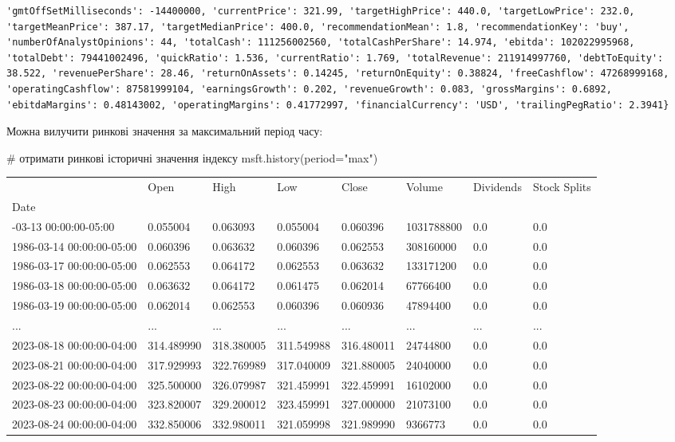\documentclass[
  letterpaper,
]{report}
\newenvironment{Shaded}{\begin{snugshade}}{\end{snugshade}}
\newcommand{\CommentTok}[1]{\textcolor[rgb]{0.37,0.37,0.37}{#1}}
\newcommand{\NormalTok}[1]{\textcolor[rgb]{0.00,0.23,0.31}{#1}}
\newcommand{\OperatorTok}[1]{\textcolor[rgb]{0.37,0.37,0.37}{#1}}
\newcommand{\StringTok}[1]{\textcolor[rgb]{0.13,0.47,0.30}{#1}}
\begin{document}
\begin{verbatim}
'gmtOffSetMilliseconds': -14400000, 'currentPrice': 321.99, 'targetHighPrice': 440.0, 'targetLowPrice': 232.0, 'targetMeanPrice': 387.17, 'targetMedianPrice': 400.0, 'recommendationMean': 1.8, 'recommendationKey': 'buy', 'numberOfAnalystOpinions': 44, 'totalCash': 111256002560, 'totalCashPerShare': 14.974, 'ebitda': 102022995968, 'totalDebt': 79441002496, 'quickRatio': 1.536, 'currentRatio': 1.769, 'totalRevenue': 211914997760, 'debtToEquity': 38.522, 'revenuePerShare': 28.46, 'returnOnAssets': 0.14245, 'returnOnEquity': 0.38824, 'freeCashflow': 47268999168, 'operatingCashflow': 87581999104, 'earningsGrowth': 0.202, 'revenueGrowth': 0.083, 'grossMargins': 0.6892, 'ebitdaMargins': 0.48143002, 'operatingMargins': 0.41772997, 'financialCurrency': 'USD', 'trailingPegRatio': 2.3941}
\end{verbatim}

Можна вилучити ринкові значення за максимальний період часу:

\begin{Shaded}
\begin{Highlighting}[]
\CommentTok{\# отримати ринкові історичні значення індексу}
\NormalTok{msft.history(period}\OperatorTok{=}\StringTok{"max"}\NormalTok{)}
\end{Highlighting}
\end{Shaded}

\begin{longtable}[]{@{}llllllll@{}}
\toprule\noalign{}
& Open & High & Low & Close & Volume & Dividends & Stock Splits \\
Date & & & & & & & \\
\midrule\noalign{}
\endhead
\bottomrule\noalign{}
\endlastfoot
1986-03-13 00:00:00-05:00 & 0.055004 & 0.063093 & 0.055004 & 0.060396 &
1031788800 & 0.0 & 0.0 \\
1986-03-14 00:00:00-05:00 & 0.060396 & 0.063632 & 0.060396 & 0.062553 &
308160000 & 0.0 & 0.0 \\
1986-03-17 00:00:00-05:00 & 0.062553 & 0.064172 & 0.062553 & 0.063632 &
133171200 & 0.0 & 0.0 \\
1986-03-18 00:00:00-05:00 & 0.063632 & 0.064172 & 0.061475 & 0.062014 &
67766400 & 0.0 & 0.0 \\
1986-03-19 00:00:00-05:00 & 0.062014 & 0.062553 & 0.060396 & 0.060936 &
47894400 & 0.0 & 0.0 \\
... & ... & ... & ... & ... & ... & ... & ... \\
2023-08-18 00:00:00-04:00 & 314.489990 & 318.380005 & 311.549988 &
316.480011 & 24744800 & 0.0 & 0.0 \\
2023-08-21 00:00:00-04:00 & 317.929993 & 322.769989 & 317.040009 &
321.880005 & 24040000 & 0.0 & 0.0 \\
2023-08-22 00:00:00-04:00 & 325.500000 & 326.079987 & 321.459991 &
322.459991 & 16102000 & 0.0 & 0.0 \\
2023-08-23 00:00:00-04:00 & 323.820007 & 329.200012 & 323.459991 &
327.000000 & 21073100 & 0.0 & 0.0 \\
2023-08-24 00:00:00-04:00 & 332.850006 & 332.980011 & 321.059998 &
321.989990 & 9366773 & 0.0 & 0.0 \\
\end{longtable}
\end{document}
